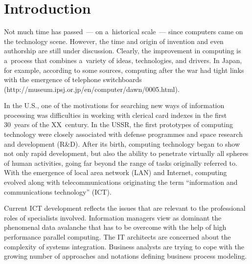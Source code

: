 
\vspace*{6pt}



      \thispagestyle{myheadings}

      \begin{multicols}{2}

                  \label{st\stat}

\section{Introduction}

  \noindent
  Not much time has passed~--- on a~historical scale~--- since computers came on the technology scene.
However, the time and origin of invention and even authorship are still under discussion. Clearly, the
improvement in computing is a~process that combines a~variety of ideas, technologies,
 and drivers. In
Japan, for example, according to some sources, computing after the war had tight links with the emergence
of telephone switchboards
({\sf http://museum.ipsj.or.jp/en/computer/dawn/0005.\linebreak html}).

 In the U.S., one of the motivations for searching new ways of information processing was difficulties in
working with clerical card indexes in the first 30~years of the XX~century. In the USSR, the first
prototypes of computing technology were closely associated with defense programmes and space
research and development (R\&D).
After its birth, computing technology began to show not only rapid development, but also the ability to
penetrate virtually all spheres of human activities, going far beyond the range of tasks originally referred to.
With the emergence of local area network (LAN) and Internet, computing evolved along with telecommunications originating
the term ``information and communications technology'' (ICT).

 Current ICT development reflects the issues that are relevant to the professional roles of specialists
involved. Information managers view as dominant the phenomenal data avalanche that has to be overcome
with the help of high performance parallel computing. The
IT architects are concerned about the complexity of
systems integration. Business analysts are trying to cope with the growing
number of approaches and
notations defining business process modeling.


\end{multicols}
